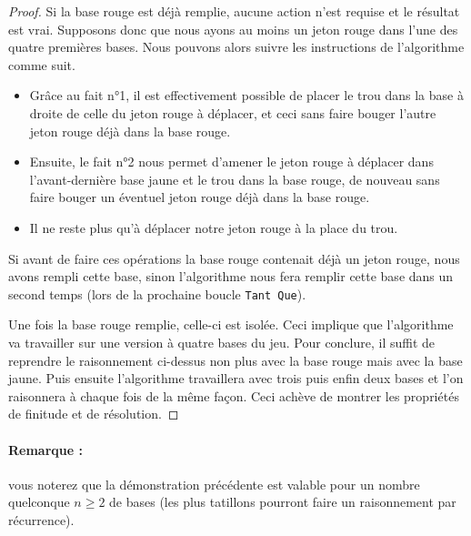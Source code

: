 \begin{proof}
	Si la base rouge est déjà remplie, aucune action n'est requise et le résultat est vrai.
	Supposons donc que nous ayons au moins un jeton rouge dans l'une des quatre premières bases. Nous pouvons alors suivre les instructions de l'algorithme comme suit.


	\medskip

	\begin{itemize}
		\item[\textbullet] Grâce au fait n°1, il est effectivement possible de placer le trou dans la base à droite de celle du jeton rouge à déplacer, et ceci sans faire bouger l'autre jeton rouge déjà dans la base rouge.

		\medskip

		\item[\textbullet] Ensuite, le fait n°2 nous permet d'amener le jeton rouge à déplacer dans l'avant-dernière base jaune et le trou dans la base rouge, de nouveau sans faire bouger un éventuel jeton rouge déjà dans la base rouge.

		\medskip

		\item[\textbullet] Il ne reste plus qu'à déplacer notre jeton rouge à la place du trou.
	\end{itemize}


	\medskip

	Si avant de faire ces opérations la base rouge contenait déjà un jeton rouge, nous avons rempli cette base, sinon l'algorithme nous fera remplir cette base dans un second temps (lors de la prochaine boucle \verb+Tant Que+).


	\medskip

	Une fois la base rouge remplie, celle-ci est isolée. Ceci implique que l'algorithme va travailler sur une version à quatre bases du jeu. Pour conclure, il suffit de reprendre le raisonnement ci-dessus non plus avec la base rouge mais avec la base jaune. Puis ensuite l'algorithme travaillera avec trois puis enfin deux bases et l'on raisonnera à chaque fois de la même façon. Ceci achève de montrer les propriétés de finitude et de résolution.

\end{proof}


\paragraph{Remarque :} \hspace{-1em} vous noterez que la démonstration précédente est valable pour un nombre quelconque $n \geqslant 2$ de bases (les plus tatillons pourront faire un raisonnement par récurrence).

